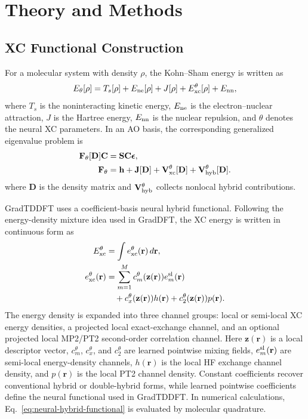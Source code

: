 \section{Theory and Methods}
\label{sec:theory}

\subsection{XC Functional Construction}
\label{sec:theory-dft}

For a molecular system with density $\rho$, the Kohn--Sham energy is
written as
\begin{equation}
  E_\theta[\rho]
  =
  T_s[\rho]
  + E_{\rm ne}[\rho]
  + J[\rho]
  + E_{\rm xc}^{\theta}[\rho]
  + E_{\rm nn},
  \label{eq:dft-energy}
\end{equation}
where $T_s$ is the noninteracting kinetic energy, $E_{\rm ne}$ is the
electron--nuclear attraction, $J$ is the Hartree energy, $E_{\rm nn}$
is the nuclear repulsion, and $\theta$ denotes the neural XC
parameters. In an AO basis, the corresponding generalized
eigenvalue problem is
\begin{align}
  \mathbf{F}_\theta[\mathbf{D}]\mathbf{C}
  &=
  \mathbf{S}\mathbf{C}\boldsymbol{\epsilon},
  \label{eq:ks-fock}
  \\
  \mathbf{F}_\theta
  &=
  \mathbf{h}
  + \mathbf{J}[\mathbf{D}]
  + \mathbf{V}_{\rm xc}^{\theta}[\mathbf{D}]
  + \mathbf{V}_{\rm hyb}^{\theta}[\mathbf{D}].
  \nonumber
\end{align}
where $\mathbf{D}$ is the density matrix and
$\mathbf{V}_{\rm hyb}^{\theta}$ collects nonlocal hybrid
contributions.

GradTDDFT uses a coefficient-basis neural hybrid functional. Following
the energy-density mixture idea used in GradDFT,\cite{GradDFT} the XC
energy is written in continuous form as
\begin{align}
  E_{\rm xc}^{\theta}
  &=
  \int e_{\rm xc}^{\theta}(\mathbf{r})\,d\mathbf{r},
  \nonumber
  \\
  e_{\rm xc}^{\theta}(\mathbf{r})
  &=
  \sum_{m=1}^{M}
  c_m^{\theta}(\mathbf{z}(\mathbf{r}))e_m^{\rm sl}(\mathbf{r})
  \nonumber
  \\
  &\quad
  + c_x^{\theta}(\mathbf{z}(\mathbf{r}))h(\mathbf{r})
  + c_2^{\theta}(\mathbf{z}(\mathbf{r}))p(\mathbf{r}) .
  \label{eq:neural-hybrid-functional}
\end{align}
The energy density is expanded into three channel groups: local or
semi-local XC energy densities, a projected local exact-exchange
channel, and an optional projected local MP2/PT2 second-order
correlation channel. Here $\mathbf{z}(\mathbf{r})$ is a local
descriptor vector, $c_m^\theta$, $c_x^\theta$, and $c_2^\theta$ are
learned pointwise mixing fields, $e_m^{\rm sl}(\mathbf{r})$ are
semi-local energy-density channels, $h(\mathbf{r})$ is the local HF
exchange channel density, and $p(\mathbf{r})$ is the local PT2 channel
density. Constant coefficients recover conventional hybrid or
double-hybrid forms, while learned pointwise coefficients define the
neural functional used in GradTDDFT. In numerical calculations,
Eq.~\eqref{eq:neural-hybrid-functional} is evaluated by molecular
quadrature.

